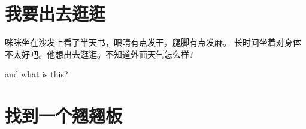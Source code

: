 \chapter{我要出去逛逛}


\pagecolor{gray}



{\linespread{1.2}\fontsize{16}{18}\selectfont
咪咪坐在沙发上看了半天书，眼睛有点发干，腿脚有点发麻。
长时间坐着对身体不太好吧。他想出去逛逛。不知道外面天气怎么样?
\par}

\ClearShipoutPicture

\newpage


and what is this?

\chapter{找到一个翘翘板}
